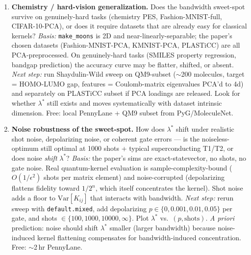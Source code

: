 \begin{enumerate}
\item \textbf{Chemistry / hard-vision generalization.}
Does the bandwidth sweet-spot survive on genuinely-hard tasks (chemistry PES,
Fashion-MNIST-full, CIFAR-10-PCA), or does it require datasets that are
already easy for classical kernels?
\emph{Basis:} \texttt{make\_moons} is 2D and near-linearly-separable; the
paper's chosen datasets (Fashion-MNIST-PCA, KMNIST-PCA, PLASTiCC) are all
PCA-preprocessed. On genuinely-hard tasks (SMILES property regression,
bandgap prediction) the accuracy curve may be flatter, shifted, or absent.
\emph{Next step:} run Shaydulin-Wild sweep on QM9-subset ($\sim$200 molecules,
target = HOMO-LUMO gap, features = Coulomb-matrix eigenvalues PCA'd to 4d)
and separately on PLASTiCC subset if PCA loadings are released. Look for
whether $\lambda^*$ still exists and moves systematically with dataset
intrinsic dimension. Free: local PennyLane + QM9 subset from PyG/MoleculeNet.

\item \textbf{Noise robustness of the sweet-spot.}
How does $\lambda^*$ shift under realistic shot noise, depolarizing noise, or
coherent gate errors --- is the noiseless-optimum still optimal at
1000 shots + typical superconducting T1/T2, or does noise \emph{shift}
$\lambda^*$?
\emph{Basis:} the paper's sims are exact-statevector, no shots, no gate noise.
Real quantum-kernel evaluation is sample-complexity-bound ($O(1/\epsilon^2)$
shots per matrix element) and noise-corrupted (depolarizing flattens fidelity
toward $1/2^n$, which itself concentrates the kernel). Shot noise adds a floor
to $\mathrm{Var}[K_{ij}]$ that interacts with bandwidth.
\emph{Next step:} rerun sweep with \texttt{default.mixed}, add depolarizing
$p \in \{0, 0.001, 0.01, 0.05\}$ per gate, and shots $\in \{100, 1000, 10000, \infty\}$.
Plot $\lambda^*$ vs.\ $(p, \text{shots})$. \emph{A priori} prediction: noise
should shift $\lambda^*$ smaller (larger bandwidth) because noise-induced
kernel flattening compensates for bandwidth-induced concentration. Free:
$\sim$2\,hr PennyLane.


\end{enumerate}
